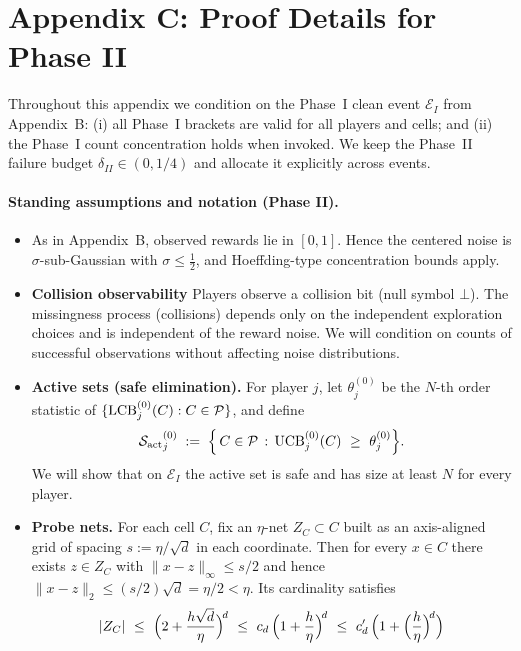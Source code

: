 \section*{Appendix C: Proof Details for Phase II}
\label{app:phase2}

Throughout this appendix we condition on the Phase~I clean event $\mathcal E_I$ from Appendix~B:
(i) all Phase~I brackets are valid for all players and cells; and
(ii) the Phase~I count concentration holds when invoked.
We keep the Phase~II failure budget $\delta_{II}\in(0,1/4)$ and allocate it explicitly across events.

\paragraph{Standing assumptions and notation (Phase II).}
\begin{itemize}
\item As in Appendix~B, observed rewards lie in $[0,1]$. Hence the centered noise is $\sigma$-sub-Gaussian with $\sigma\le \tfrac12$, and Hoeffding-type concentration bounds apply.
\item \textbf{Collision observability} Players observe a collision bit (null symbol $\bot$). The missingness process (collisions) depends only on the independent exploration choices and is independent of the reward noise. We will condition on counts of successful observations without affecting noise distributions.
\item \textbf{Active sets (safe elimination).} For player $j$, let $\theta^{(0)}_j$ be the $N$-th order statistic of $\{\operatorname{LCB}^{(0)}_j(C):C\in\mathcal{P}\}$, and define
\begin{equation}
\label{eq:active-set-def}
\Sact^{(0)}_j \;:=\; \Bigl\{\,C\in \Pcal \,:\, \UCB^{(0)}_j(C)\ \ge\ \theta^{(0)}_j \Bigr\}.
\end{equation}
We will show that on $\mathcal E_I$ the active set is  {safe} and has size at least $N$ for every player.
\item \textbf{Probe nets.} For each cell $C$, fix an $\eta$-net $Z_C\subset C$ built as an axis-aligned grid of spacing $s:=\eta/\sqrt d$ in each coordinate. Then for every $x\in C$ there exists $z\in Z_C$ with $\|x-z\|_\infty\le s/2$ and hence $\|x-z\|_2\le (s/2)\sqrt d=\eta/2<\eta$. Its cardinality satisfies
\begin{equation}
\label{eq:Pmax}
|Z_C|\ \le\ \Bigl(2+\frac{h\sqrt d}{\eta}\Bigr)^{\!d}
\ \le\ c_d\,\Bigl(1+\frac{h}{\eta}\Bigr)^{\!d}
\ \le\ c'_d\,\Bigl(1+\Bigl(\frac{h}{\eta}\Bigr)^{\!d}\Bigr)

\end{equation}
\end{itemize}
